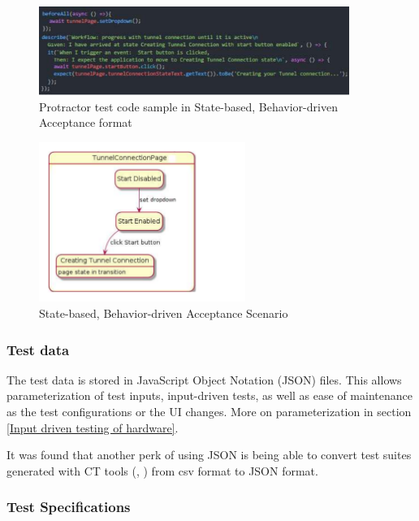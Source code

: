 \documentclass[conference]{IEEEtran}
\begin{document}
	\begin{figure}[!h]
		\centering
			\includegraphics[width=0.90\textwidth]{codeSample.pdf}
		\caption{Protractor test code sample in State-based, Behavior-driven Acceptance format}
		\label{fig:codeSample}
	\end{figure}	

			
	\begin{figure}[!b]
		\includegraphics[width=0.60\textwidth,]{stateBasedScenario.pdf}
		\caption{State-based, Behavior-driven Acceptance Scenario}
		\label{fig:stateBasedScenario}
	\end{figure}
	
	\subsubsection{Test data}
	The test data is stored in JavaScript Object Notation (JSON) files. 
	This allows parameterization of test inputs, input-driven tests, as well as ease of maintenance as the test configurations or the UI changes.
	More on parameterization in section \ref{Input driven testing of hardware}.
	
	It was found that another perk of using JSON is being able to convert test suites generated with CT tools (\cite{gargantini2018migrating}, \cite{ACTS-tool}) from csv format to JSON format.

	\subsubsection{Test Specifications}
\end{document}
